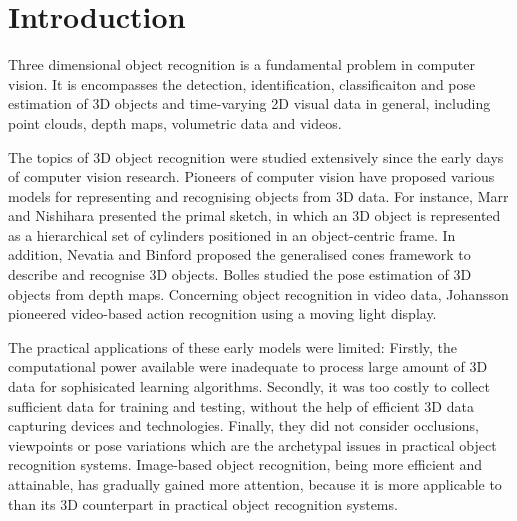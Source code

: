 \chapter{Introduction}
\label{chap/intro} 

Three dimensional object recognition is a fundamental problem in computer vision. It is encompasses the detection, identification, classificaiton and pose estimation of 3D objects and time-varying 2D visual data in general, including point clouds, depth maps, volumetric data and videos. 

The topics of 3D object recognition were studied extensively since the early days of computer vision research. 
Pioneers of computer vision have proposed various models for representing and recognising objects from 3D data.
For instance, Marr and Nishihara \cite{Marr1978} presented the primal sketch, in which an 3D object is represented as a hierarchical set of cylinders positioned in an object-centric frame. 
In addition, Nevatia and Binford \cite{Nevatia1977} proposed the generalised cones framework to describe and recognise 3D objects. Bolles \etal \cite{Bolles1983} studied the pose estimation of 3D objects from depth maps.
Concerning object recognition in video data, Johansson \cite{Johansson1973} pioneered video-based action recognition using a moving light display. 

The practical applications of these early models were limited: Firstly, the computational power available were inadequate to process large amount of 3D data for sophisicated learning algorithms. Secondly, it was too costly to collect sufficient data for training and testing, without the help of efficient 3D data capturing devices and technologies. Finally, they did not consider occlusions, viewpoints or pose variations which are the archetypal issues in practical object recognition systems. Image-based object recognition, being more efficient and attainable, has gradually gained more attention, because it is more applicable to than its 3D counterpart in practical object recognition systems.   

